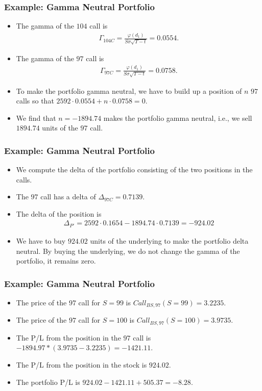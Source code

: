 \begin{frame}[fragile]
\frametitle{Example: Gamma Neutral Portfolio}
\begin{itemize}
  \item The gamma of the $104$ call is
  \begin{align*}
  \Gamma_{104C} = \frac{\varphi(d_1)}{S\sigma \sqrt{T-t}} = 0.0554.
  \end{align*}
  \item The gamma of the $97$ call is
  \begin{align*}
  \Gamma_{97C} = \frac{\varphi(d_1)}{S\sigma \sqrt{T-t}} = 0.0758.
  \end{align*}
  \item To make the portfolio gamma neutral, we have to build up a position of
  $n$ $97$ calls so that $2592\cdot 0.0554 +n\cdot 0.0758 = 0$.
  \item We find that $n=-1894.74$ makes the portfolio gamma neutral, i.e., we
  sell $1894.74$ units of the $97$ call.
\end{itemize}
\end{frame}

\begin{frame}[fragile]
\frametitle{Example: Gamma Neutral Portfolio}
\begin{itemize}
  \item We compute the delta of the portfolio consisting of the two positions in
  the calls.
  \item The $97$ call has a delta of $\Delta_{97C}=0.7139$.
  \item The delta of the position is
  \begin{align*}
    \Delta_{P'} = 2592 \cdot 0.1654 - 1894.74 \cdot 0.7139 = -924.02
  \end{align*}
  \item We have to buy $924.02$ units of the underlying to make the portfolio
  delta neutral. By buying the underlying, we do not change the gamma of the
  portfolio, it remains zero.
\end{itemize}
\end{frame}

\begin{frame}[fragile]
\frametitle{Example: Gamma Neutral Portfolio}
\begin{itemize}
  \item The price of the $97$ call for $S=99$ is $Call_{BS,97}(S=99)=3.2235$.
  \item The price of the $97$ call for $S=100$ is $Call_{BS,97}(S=100)=3.9735$.
  \item The P/L from the position in the $97$ call is
  $-1894.97*(3.9735-3.2235)=-1421.11$.
  \item The P/L from the position in the stock is $924.02$.
  \item The portfolio P/L is $924.02-1421.11+505.37=-8.28.$
\end{itemize}
\end{frame}

